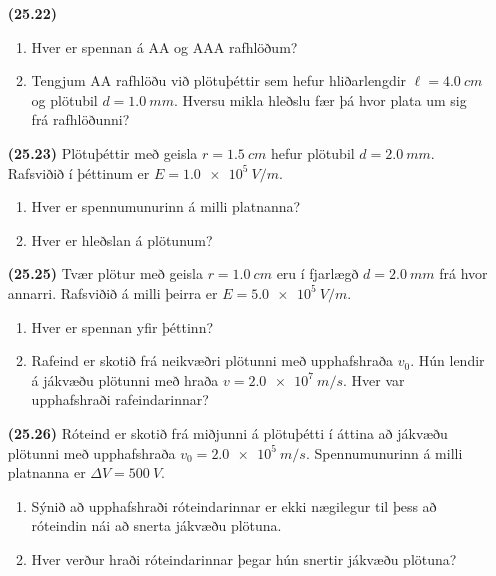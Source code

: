 \ifdefined \wholebook \else\documentclass[oneside]{book}\usepackage{EdlBook}\graphicspath{{figures/}}
\begin{document}
\begin{enumerate}[label = \textbf{(\alph*)}]

\item[\textbf{(25.22)}] \begin{enumerate}[label = \textbf{(\alph*)}]
    \item Hver er spennan á AA og AAA rafhlöðum?
    \item Tengjum AA rafhlöðu við plötuþéttir sem hefur hliðarlengdir $\ell = \SI{4.0}{cm}$ og plötubil $d = \SI{1.0}{mm}$. Hversu mikla hleðslu fær þá hvor plata um sig frá rafhlöðunni?
\end{enumerate}

\item[\textbf{(25.23)}] Plötuþéttir með geisla $r = \SI{1.5}{cm}$ hefur plötubil $d = \SI{2.0}{mm}$. Rafsviðið í þéttinum er $E = \SI{1.0e5}{V/m}$. 
\begin{enumerate}[label = \textbf{(\alph*)}]
    \item Hver er spennumunurinn á milli platnanna?
    \item Hver er hleðslan á plötunum?
\end{enumerate}

\item[\textbf{(25.25)}] Tvær plötur með geisla $r = \SI{1.0}{cm}$ eru í fjarlægð $d = \SI{2.0}{mm}$ frá hvor annarri. Rafsviðið á milli þeirra er $E = \SI{5.0e5}{V/m}$.
\begin{enumerate}[label = \textbf{(\alph*)}]
    \item Hver er spennan yfir þéttinn?
    \item Rafeind er skotið frá neikvæðri plötunni með upphafshraða $v_0$. Hún lendir á jákvæðu plötunni með hraða $v = \SI{2.0e7}{m/s}$. Hver var upphafshraði rafeindarinnar? 
\end{enumerate}

\item[\textbf{(25.26)}] Róteind er skotið frá miðjunni á plötuþétti í áttina að jákvæðu plötunni með upphafshraða $v_0 = \SI{2.0e5}{m/s}$. Spennumunurinn á milli platnanna er $\Delta V = \SI{500}{V}$.

\begin{enumerate}[label = \textbf{(\alph*)}]
    \item Sýnið að upphafshraði róteindarinnar er ekki nægilegur til þess að róteindin nái að snerta jákvæðu plötuna.
    \item Hver verður hraði róteindarinnar þegar hún snertir jákvæðu plötuna?
\end{enumerate}

\end{enumerate}
\end{document}

